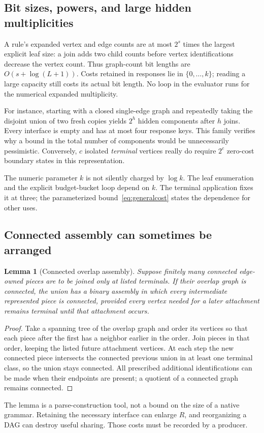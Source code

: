 \documentclass[11pt,a4paper]{article}
\newtheorem{lemma}[theorem]{Lemma}
\theoremstyle{definition}
\theoremstyle{remark}
\begin{document}
\subsection{Bit sizes, powers, and large hidden multiplicities}
A rule's expanded vertex and edge counts are at most $2^s$ times the largest explicit leaf size: a join adds two child counts before vertex identifications decrease the vertex count. Thus graph-count bit lengths are $O(s+\log(L+1))$. Costs retained in responses lie in $\{0,\ldots,k\}$; reading a large capacity still costs its actual bit length. No loop in the evaluator runs for the numerical expanded multiplicity.

For instance, starting with a closed single-edge graph and repeatedly taking the disjoint union of two fresh copies yields $2^h$ hidden components after $h$ joins. Every interface is empty and has at most four response keys. This family verifies why a bound in the total number of components would be unnecessarily pessimistic. Conversely, $c$ isolated \emph{terminal} vertices really do require $2^c$ zero-cost boundary states in this representation.

The numeric parameter $k$ is not silently charged by $\log k$. The leaf enumeration and the explicit budget-bucket loop depend on $k$. The terminal application fixes it at three; the parameterized bound~\eqref{eq:generalcost} states the dependence for other uses.

\subsection{Connected assembly can sometimes be arranged}
\begin{lemma}[Connected overlap assembly]
\label{lem:assembly}
Suppose finitely many connected edge-owned pieces are to be joined only at listed terminals. If their overlap graph is connected, the union has a binary assembly in which every intermediate represented piece is connected, provided every vertex needed for a later attachment remains terminal until that attachment occurs.
\end{lemma}
\begin{proof}
Take a spanning tree of the overlap graph and order its vertices so that each piece after the first has a neighbor earlier in the order. Join pieces in that order, keeping the listed future attachment vertices. At each step the new connected piece intersects the connected previous union in at least one terminal class, so the union stays connected. All prescribed additional identifications can be made when their endpoints are present; a quotient of a connected graph remains connected.
\end{proof}
The lemma is a parse-construction tool, not a bound on the size of a native grammar. Retaining the necessary interface can enlarge $R$, and reorganizing a DAG can destroy useful sharing. Those costs must be recorded by a producer.
\end{document}

